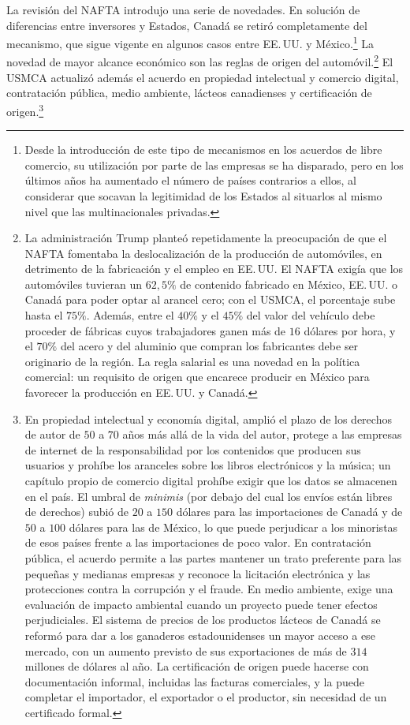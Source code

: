 \documentclass[10pt,a4paper]{article}
\begin{document}
La revisión del NAFTA introdujo una serie de novedades. En solución de diferencias entre inversores y Estados, Canadá se retiró completamente del mecanismo, que sigue vigente en algunos casos entre EE.\,UU. y México.\footnote{%
    Desde la introducción de este tipo de mecanismos en los acuerdos de libre comercio, su utilización por parte de las empresas se ha disparado, pero en los últimos años ha aumentado el número de países contrarios a ellos, al considerar que socavan la legitimidad de los Estados al situarlos al mismo nivel que las multinacionales privadas.
} La novedad de mayor alcance económico son las reglas de origen del automóvil.\footnote{%
    La administración Trump planteó repetidamente la preocupación de que el NAFTA fomentaba la deslocalización de la producción de automóviles, en detrimento de la fabricación y el empleo en EE.\,UU. El NAFTA exigía que los automóviles tuvieran un $62,5\%$ de contenido fabricado en México, EE.\,UU. o Canadá para poder optar al arancel cero; con el USMCA, el porcentaje sube hasta el $75\%$. Además, entre el $40\%$ y el $45\%$ del valor del vehículo debe proceder de fábricas cuyos trabajadores ganen más de $16$ dólares por hora, y el $70\%$ del acero y del aluminio que compran los fabricantes debe ser originario de la región. La regla salarial es una novedad en la política comercial: un requisito de origen que encarece producir en México para favorecer la producción en EE.\,UU. y Canadá.
} El USMCA actualizó además el acuerdo en propiedad intelectual y comercio digital, contratación pública, medio ambiente, lácteos canadienses y certificación de origen.\footnote{%
    En propiedad intelectual y economía digital, amplió el plazo de los derechos de autor de $50$ a $70$ años más allá de la vida del autor, protege a las empresas de internet de la responsabilidad por los contenidos que producen sus usuarios y prohíbe los aranceles sobre los libros electrónicos y la música; un capítulo propio de comercio digital prohíbe exigir que los datos se almacenen en el país. El umbral de \textit{minimis} (por debajo del cual los envíos están libres de derechos) subió de $20$ a $150$ dólares para las importaciones de Canadá y de $50$ a $100$ dólares para las de México, lo que puede perjudicar a los minoristas de esos países frente a las importaciones de poco valor. En contratación pública, el acuerdo permite a las partes mantener un trato preferente para las pequeñas y medianas empresas y reconoce la licitación electrónica y las protecciones contra la corrupción y el fraude. En medio ambiente, exige una evaluación de impacto ambiental cuando un proyecto puede tener efectos perjudiciales. El sistema de precios de los productos lácteos de Canadá se reformó para dar a los ganaderos estadounidenses un mayor acceso a ese mercado, con un aumento previsto de sus exportaciones de más de $314$ millones de dólares al año. La certificación de origen puede hacerse con documentación informal, incluidas las facturas comerciales, y la puede completar el importador, el exportador o el productor, sin necesidad de un certificado formal.
}
\end{document}
